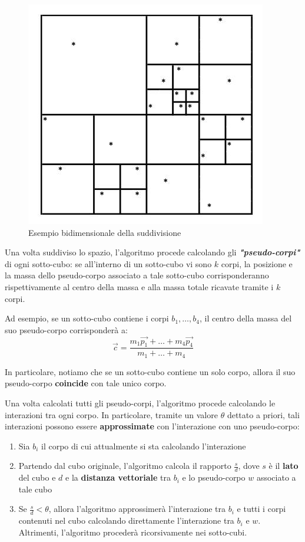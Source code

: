 \documentclass[12pt]{report}
\renewcommand\vec{\overrightarrow}
\begin{document}
    \begin{figure}[H]
        \centering
        \includegraphics[scale=0.7]{images/4tree.png}
        \caption{Esempio bidimensionale della suddivisione}
        \label{fig:4tree}
    \end{figure}

    Una volta suddiviso lo spazio, l'algoritmo procede calcolando gli \textbf{\textit{"pseudo-corpi"}} di ogni sotto-cubo: se all'interno di un sotto-cubo vi sono $k$ corpi, la posizione e la massa dello pseudo-corpo associato a tale sotto-cubo corrisponderanno rispettivamente al centro della massa e alla massa totale ricavate tramite i $k$ corpi.

    Ad esempio, se un sotto-cubo contiene i corpi $b_1, \ldots, b_4$, il centro della massa del suo pseudo-corpo corrisponderà a:
    \[\vec{c} = \frac{m_1\vec{p_1} + \ldots + m_4 \vec{p_4}}{m_1 + \ldots + m_4}\]

    In particolare, notiamo che se un sotto-cubo contiene un solo corpo, allora il suo pseudo-corpo \textbf{coincide} con tale unico corpo.

    Una volta calcolati tutti gli pseudo-corpi, l'algoritmo procede calcolando le interazioni tra ogni corpo. In particolare, tramite un valore $\theta$ dettato a priori, tali interazioni possono essere \textbf{approssimate} con l'interazione con uno pseudo-corpo:
    \begin{enumerate}
        \item Sia $b_i$ il corpo di cui attualmente si sta calcolando l'interazione
        \item Partendo dal cubo originale, l'algoritmo calcola il rapporto $\frac{s}{d}$, dove $s$ è il \textbf{lato} del cubo e $d$ e la \textbf{distanza vettoriale} tra $b_i$ e lo pseudo-corpo $w$ associato a tale cubo
        \item Se $\frac{s}{d} < \theta$, allora l'algoritmo approssimerà l'interazione tra $b_i$ e tutti i corpi contenuti nel cubo calcolando direttamente l'interazione tra $b_i$ e $w$. Altrimenti, l'algoritmo procederà ricorsivamente nei sotto-cubi. 
    \end{enumerate}
    
\end{document}
